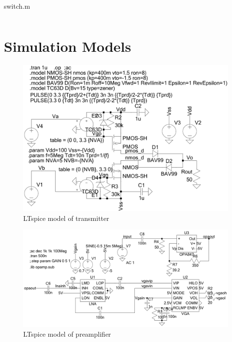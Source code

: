 \begin{longlisting}
	\caption{switch.m}
	\label{lst:switch.m}
	\inputminted[bgcolor=LightGray,fontsize=\footnotesize,linenos,breaklines]{matlab}{Figures/appendix/matlab/Switch_demo.m}
\end{longlisting}


\chapter{Simulation Models}
\begin{figure}[htbp]
	\centering
	\includegraphics[width=.9\textwidth]{Figures/appendix/ltspice_transmitter.pdf}
	\caption{LTspice model of transmitter}
	\label{fig:app_ltspice_transmitter}
\end{figure}
\begin{figure}[htbp]
	\centering
	\includegraphics[width=.9\textwidth]{Figures/appendix/ltspice_preamp.pdf}
	\caption{LTspice model of preamplifier}
	\label{fig:app_ltspice_preamp}
\end{figure}
